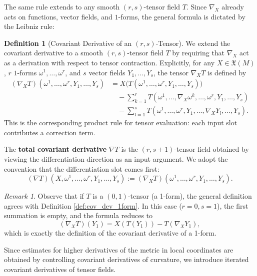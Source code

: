 \documentclass[11pt]{article}
\theoremstyle{plain}
\theoremstyle{definition}
\newtheorem{definition}[theorem]{Definition}
\theoremstyle{remark}
\newtheorem{remark}[theorem]{Remark}
\begin{document}
The same rule extends to any smooth $(r,s)$-tensor field $T$.  Since
$\nabla_X$ already acts on functions, vector fields, and $1$-forms, the
general formula is dictated by the Leibniz rule:

\begin{definition}[Covariant Derivative of an $(r,s)$-Tensor]
\label{def:cov_dev_general}
    We extend the covariant derivative to a smooth $(r,s)$-tensor field $T$
    by requiring that $\nabla_X$ act as a derivation with respect to tensor
    contraction.  Explicitly, for any $X\in\mathfrak{X}(M)$, $r$
    $1$-forms $\omega^1,\dots,\omega^r$, and $s$ vector fields
    $Y_1,\dots,Y_s$, the tensor $\nabla_XT$ is defined by
    \begin{align}
        (\nabla_X T)(\omega^1, \dots, \omega^r, Y_1, \dots, Y_s) &= X \big( T(\omega^1, \dots, \omega^r, Y_1, \dots, Y_s) \big) \nonumber \\
        &\quad - \sum_{k=1}^r T(\omega^1, \dots, \nabla_X \omega^k, \dots, \omega^r, Y_1, \dots, Y_s) \nonumber \\
        &\quad - \sum_{l=1}^s T(\omega^1, \dots, \omega^r, Y_1, \dots, \nabla_X Y_l, \dots, Y_s).
    \end{align}
This is the corresponding product rule for tensor evaluation: each input
slot contributes a correction term.
    
    The \textbf{total covariant derivative} $\nabla T$ is the $(r, s+1)$-tensor field obtained by viewing the differentiation direction as an input argument. We adopt the convention that the differentiation slot comes first:
    \begin{equation}
        (\nabla T)(X, \omega^1, \dots, \omega^r, Y_1, \dots, Y_s) := (\nabla_X T)(\omega^1, \dots, \omega^r, Y_1, \dots, Y_s).
    \end{equation}
\end{definition}

\begin{remark}
    Observe that if $T$ is a $(0,1)$-tensor (a 1-form), the general definition agrees with Definition \ref{def:cov_dev_1form}. In this case ($r=0, s=1$), the first summation is empty, and the formula reduces to
    \begin{equation}
        (\nabla_X T)(Y_1) = X(T(Y_1)) - T(\nabla_X Y_1),
    \end{equation}
    which is exactly the definition of the covariant derivative of a 1-form.
\end{remark}

Since estimates for higher derivatives of the metric in local coordinates
are obtained by controlling covariant derivatives of curvature, we introduce
iterated covariant derivatives of tensor fields.
\end{document}
